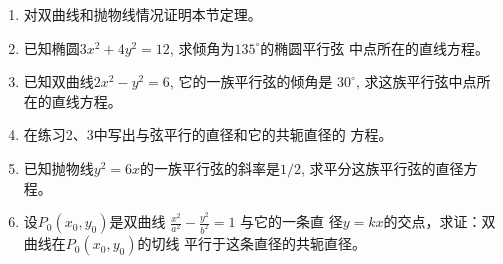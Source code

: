 \begin{solution}
    
\end{solution}

\begin{example}
    
\end{example}



\begin{solution}
    
\end{solution}

\begin{example}
    
\end{example}



\begin{solution}
    
\end{solution}




















\begin{ex}
\begin{enumerate}
    \item 对双曲线和抛物线情况证明本节定理。
    \item 已知椭圆$3x^2+4y^2=12$, 求倾角为$135^{\circ}$的椭圆平行弦
    中点所在的直线方程。
    \item 已知双曲线$2x^2-y^2=6$, 它的一族平行弦的倾角是
    $30^{\circ}$, 求这族平行弦中点所在的直线方程。
    \item 在练习2、3中写出与弦平行的直径和它的共轭直径的
    方程。
    \item 已知抛物线$y^2=6x$的一族平行弦的斜率是$1/2$, 
    求平分这族平行弦的直径方程。
    \item 设$P_0(x_0,y_0)$是双曲线
    $\frac{x^2}{a^2}-\frac{y^2}{b^2}=1$
    与它的一条直
    径$y=kx$的交点，求证：双曲线在$P_0(x_0,y_0)$的切线
    平行于这条直径的共轭直径。
\end{enumerate}
\end{ex}

